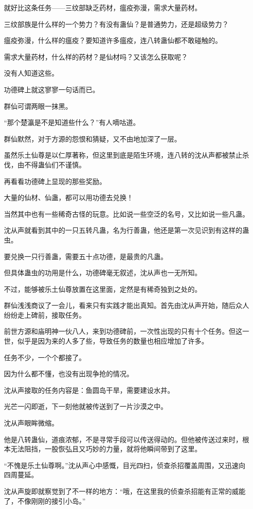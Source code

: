 \begin{this_body}
就好比这条任务——三纹部缺乏药材，瘟疫弥漫，需求大量药材。

三纹部族是什么样的一个势力？有没有蛊仙？是普通势力，还是超级势力？

瘟疫弥漫，什么样的瘟疫？要知道许多瘟疫，连八转蛊仙都不敢碰触的。

需求大量药材，什么样的药材？是仙材吗？又该怎么获取呢？

没有人知道这些。

功德碑上就这寥寥一句话而已。

群仙可谓两眼一抹黑。

“那个楚瀛是不是知道些什么？”有人嘀咕道。

群仙默然，对于方源的怨恨和猜疑，又不由地加深了一层。

虽然乐土仙尊是以仁厚著称，但这里到底是陌生环境，连八转的沈从声都被禁止杀伐，由不得蛊仙们不谨慎。

再看看功德碑上显现的那些奖励。

大量的仙材、仙蛊，都可以用功德去兑换！

当然其中也有一些稀奇古怪的玩意。比如说一些空泛的名号，又比如说一些凡蛊。

沈从声就看到其中的一只五转凡蛊，名为行善蛊，他还是第一次见识到有这样的蛊虫。

要兑换一只行善蛊，需要五十点功德，是最贵的凡蛊。

但具体蛊虫的功用是什么，功德碑毫无叙述，沈从声也一无所知。

不过，能够被乐土仙尊放置在这里面，定然是有稀奇独到之处的。

群仙浅浅商议了一会儿，看来只有实践才能出真知。首先由沈从声开始，随后众人纷纷走上碑前，接取任务。

前世方源和庙明神一伙八人，来到功德碑前，一次性出现的只有十个任务。但这一世，似乎是因为来的人多了些，导致任务的数量也相应增加了许多。

任务不少，一个个都接了。

因为什么都不懂，也没有出现争抢的情况。

沈从声接取的任务内容是：鱼圆岛干旱，需要建设水井。

光芒一闪即逝，下一刻他就被传送到了一片沙漠之中。

沈从声眼眸微缩。

他是八转蛊仙，道痕浓郁，不是寻常手段可以传送得动的。但他被传送过来时，根本无法阻挡，一股恢弘且又巧妙的力量，就将他瞬间带到了这里。

“不愧是乐土仙尊啊。”沈从声心中感慨，目光四扫，侦查杀招覆盖周围，又迅速向四周蔓延。

沈从声旋即就察觉到了不一样的地方：“哦，在这里我的侦查杀招能有正常的威能了，不像刚刚的接引小岛。”


\end{this_body}
